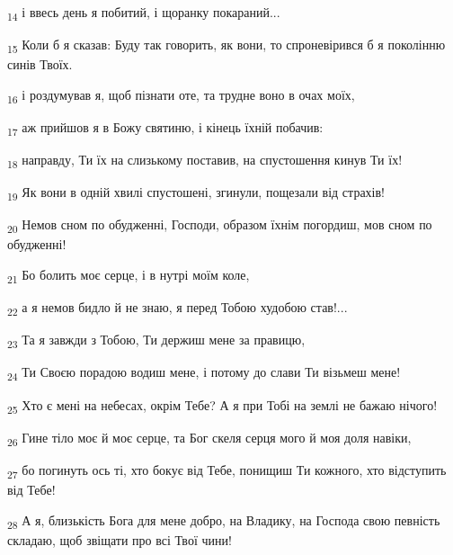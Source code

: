 \begin{tcolorbox}
\textsubscript{14} і ввесь день я побитий, і щоранку покараний...
\end{tcolorbox}
\begin{tcolorbox}
\textsubscript{15} Коли б я сказав: Буду так говорить, як вони, то спроневірився б я поколінню синів Твоїх.
\end{tcolorbox}
\begin{tcolorbox}
\textsubscript{16} і роздумував я, щоб пізнати оте, та трудне воно в очах моїх,
\end{tcolorbox}
\begin{tcolorbox}
\textsubscript{17} аж прийшов я в Божу святиню, і кінець їхній побачив:
\end{tcolorbox}
\begin{tcolorbox}
\textsubscript{18} направду, Ти їх на слизькому поставив, на спустошення кинув Ти їх!
\end{tcolorbox}
\begin{tcolorbox}
\textsubscript{19} Як вони в одній хвилі спустошені, згинули, пощезали від страхів!
\end{tcolorbox}
\begin{tcolorbox}
\textsubscript{20} Немов сном по обудженні, Господи, образом їхнім погордиш, мов сном по обудженні!
\end{tcolorbox}
\begin{tcolorbox}
\textsubscript{21} Бо болить моє серце, і в нутрі моїм коле,
\end{tcolorbox}
\begin{tcolorbox}
\textsubscript{22} а я немов бидло й не знаю, я перед Тобою худобою став!...
\end{tcolorbox}
\begin{tcolorbox}
\textsubscript{23} Та я завжди з Тобою, Ти держиш мене за правицю,
\end{tcolorbox}
\begin{tcolorbox}
\textsubscript{24} Ти Своєю порадою водиш мене, і потому до слави Ти візьмеш мене!
\end{tcolorbox}
\begin{tcolorbox}
\textsubscript{25} Хто є мені на небесах, окрім Тебе? А я при Тобі на землі не бажаю нічого!
\end{tcolorbox}
\begin{tcolorbox}
\textsubscript{26} Гине тіло моє й моє серце, та Бог скеля серця мого й моя доля навіки,
\end{tcolorbox}
\begin{tcolorbox}
\textsubscript{27} бо погинуть ось ті, хто бокує від Тебе, понищиш Ти кожного, хто відступить від Тебе!
\end{tcolorbox}
\begin{tcolorbox}
\textsubscript{28} А я, близькість Бога для мене добро, на Владику, на Господа свою певність складаю, щоб звіщати про всі Твої чини!
\end{tcolorbox}
